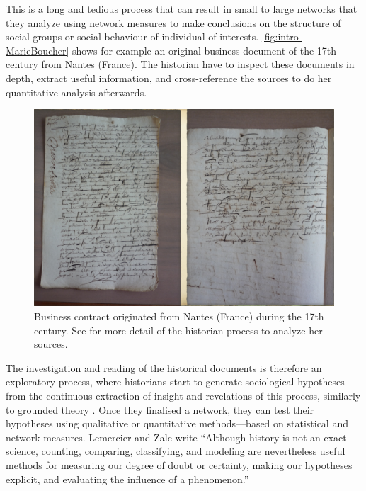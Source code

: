 This is a long and tedious process that can result in small to large networks that they analyze using network measures to make conclusions on the structure of social groups or social behaviour of individual of interests.
\autoref{fig:intro-MarieBoucher} shows for example an original business document of the 17th century from Nantes (France).
The historian have to inspect these documents in depth, extract useful information, and cross-reference the sources to do her quantitative analysis afterwards.
\begin{figure}[!ht]
    \centering %
    \includegraphics[width=1\textwidth]{static/figures/MarieBoucher}
    \caption{Business contract originated from Nantes (France) during the 17th century. See \cite{dufournaudCommentRendreVisible2018} for more detail of the historian process to analyze her sources.}
    \label{fig:intro-MarieBoucher}
\end{figure}
The investigation and reading of the historical documents is therefore an exploratory process, where historians start to generate sociological hypotheses from the continuous extraction of insight and revelations of this process, similarly to grounded theory \cite{glaserDiscoveryGroundedTheory2010}.
Once they finalised a network, they can test their hypotheses using qualitative or quantitative methods---based on statistical and network measures.
Lemercier and Zalc write ``Although history is not an exact science, counting, comparing, classifying, and modeling are nevertheless useful methods for measuring our degree of doubt or certainty, making our hypotheses explicit, and evaluating the influence of a phenomenon.''\cite{lemercierQuantitativeMethodsHumanities2019}
